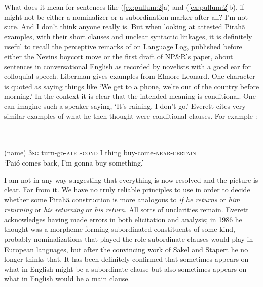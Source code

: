 \documentclass[output=paper,colorlinks,citecolor=brown
]{langscibook}
\begin{document}
What does it mean for sentences like (\ref{ex:pullum:2}a) and (\ref{ex:pullum:2}b), if \mbox{}
might not be either a nominalizer or a subordination marker after all?
I'm not sure. And I don't think anyone really is. But when looking at
attested Pirahã examples, with their short clauses and unclear
syntactic linkages, it is definitely useful to recall the perceptive
remarks of \citet{Liberman06} on Language Log, published before either
the Nevins boycott move or the first draft of NP\&R's paper, about
sentences in conversational English as recorded by novelists with a
good ear for colloquial speech. Liberman gives examples from Elmore
Leonard. One character is quoted as saying things like `We get to a
phone, we're out of the country before morning.' In the context it
is clear that the intended meaning is conditional. One can imagine
such a speaker saying, `It's raining, I don't go.' Everett cites very
similar examples of what he then thought were conditional clauses.
For example \citep[265, ex.~(241)]{Everett86HAL}:

\ea
\label{ex:pullum:5}
 \\
\gll  {}  
               \\
      (name) 3\textsc{sg} turn-go-\textsc{atel}-\textsc{cond} I thing buy-come-\textsc{near}-\textsc{certain} \\
\glt `Pai\'o comes back, I'm gonna buy something.'
\z

I am not in any way suggesting that everything is now resolved and
the picture is clear. Far from it. We have no truly reliable principles
to use in order to decide whether some Pirahã construction is
more analogous to \textit{if he returns} or \textit{him returning}
or \textit{his returning} or \textit{his return}. All sorts of
unclarities remain. Everett acknowledges having made errors in both
elicitation and analysis; in 1986 he thought \mbox{} was
a morpheme forming subordinated constituents of some kind, probably
nominalizations that played the role subordinate clauses would play
in European languages, but after the convincing work of Sakel and
Stapert he no longer thinks that. It has been definitely confirmed
that \mbox{} sometimes appears on what in English might
be a subordinate clause but also sometimes appears on what in English
would be a main clause.
\end{document}
